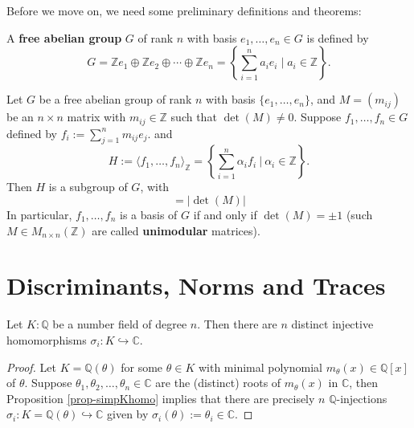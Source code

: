 \medskip
Before we move on, we need some preliminary definitions and theorems:
\begin{definition}
A {\bf free abelian group} $G$ of rank $n$ with basis $e_1, \dots, e_n \in G$ is defined by
\begin{equation*}
    G = \mathbb{Z}e_1 \oplus \mathbb{Z}e_2 \oplus \cdots \oplus \mathbb{Z}e_n = \left\{ \sum_{i=1}^n a_i e_i \mid a_i \in \mathbb{Z} \right\}.
\end{equation*}
\end{definition}

\begin{proposition} \label{prop-indexfree}
Let $G$ be a free abelian group of rank $n$ with basis $\{e_1, \ldots, e_n\}$, and $M = (m_{ij})$ be an $n \times n$ matrix with $m_{ij} \in \mathbb{Z}$ such that $\det(M) \neq 0$.
Suppose $f_1, \dots, f_n \in G$ defined by $f_i := \sum_{j=1}^n m_{ij} e_j$.
and 
$$H := \langle f_1, \dots, f_n\rangle_{\mathbb{Z}} = \left\{\sum_{i=1}^n \alpha_if_i\ |\ \alpha_i \in \mathbb{Z}\right\}.$$
Then $H$ is a subgroup of $G$, with
\begin{equation*}
    [G : H] = |\det(M)|
\end{equation*}
In particular, $f_1, \dots, f_n$ is a basis of $G$ if and only if $\det(M) = \pm 1$ (such $M \in M_{n \times n}(\mathbb{Z})$ are called {\bf unimodular} matrices).
\end{proposition}


\section{Discriminants, Norms and Traces}

\begin{theorem} \label{thm-numfieldinj} Let $K:\mathbb{Q}$ be a number field of degree $n$. Then there are $n$ distinct injective homomorphisms $\sigma_i: K \hookrightarrow \mathbb{C}$.
\end{theorem}

\begin{proof} Let $K = \mathbb{Q}(\theta)$ for some $\theta \in K$ with minimal polynomial $m_{\theta}(x) \in \mathbb{Q}[x]$ of $\theta$. Suppose $\theta_1, \theta_2, \dots, \theta_n \in \mathbb{C}$ are the (distinct) roots of $m_{\theta}(x)$ in $\mathbb{C}$, then Proposition \ref{prop-simpKhomo} implies that there are precisely $n$ $\mathbb{Q}$-injections $\sigma_i: K= \mathbb{Q}(\theta) \hookrightarrow \mathbb{C}$
given by
\(\sigma_i(\theta) := \theta_i \in \mathbb{C}\).
\end{proof}

